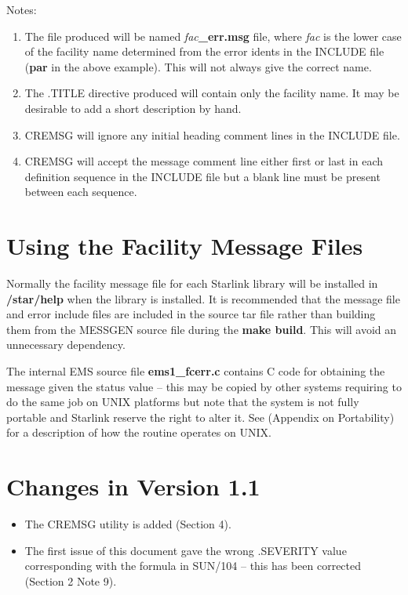 \documentclass[11pt,nolof]{starlink}
\begin{document}
Notes:
\begin{enumerate}
\item The file produced will be named \emph{fac}\textbf{\_err.msg} file, where
\emph{fac} is the lower case of the facility name determined from the error
idents in the INCLUDE file (\textbf{par} in the above example). This will not
always give the correct name.
\item The .TITLE directive produced will contain only the facility name. It
may be desirable to add a short description by hand.
\item CREMSG will ignore any initial heading comment lines in the INCLUDE file.
\item CREMSG will accept the message comment line either first or last in each
definition sequence in the INCLUDE file but a blank line must be present
between each sequence.
\end{enumerate}

\section{Using the Facility Message Files}
Normally the facility message file for each Starlink library will be installed
in \textbf{/star/help} when the library is installed. It is recommended that the
message file and error include files are included in the source tar file rather
than building them from the MESSGEN source file during the \textbf{make build}.
This will avoid an unnecessary dependency.

The internal EMS source file \textbf{ems1\_fcerr.c} contains C code for obtaining
the message given the status value -- this may be copied by other systems
requiring to do the same job on UNIX platforms but note that the system is not
fully portable and Starlink reserve the right to alter it.
See
(Appendix on Portability) for a description of how the routine operates on UNIX.

\section{Changes in Version 1.1}
\begin{itemize}
\item The CREMSG utility is added (Section 4).
\item The first issue of this document gave the wrong .SEVERITY value
corresponding with the formula in SUN/104 -- this has been corrected
(Section 2 Note 9).
\end{itemize}
\end{document}
